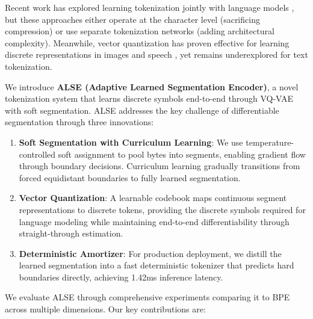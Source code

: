 \documentclass{article}
\begin{document}
Recent work has explored learning tokenization jointly with language models \cite{chung2021byt5, xue2022byt5}, but these approaches either operate at the character level (sacrificing compression) or use separate tokenization networks (adding architectural complexity). Meanwhile, vector quantization has proven effective for learning discrete representations in images \cite{van2017vqvae} and speech \cite{baevski2020wav2vec}, yet remains underexplored for text tokenization.

We introduce \textbf{ALSE (Adaptive Learned Segmentation Encoder)}, a novel tokenization system that learns discrete symbols end-to-end through VQ-VAE with soft segmentation. ALSE addresses the key challenge of differentiable segmentation through three innovations:

\begin{enumerate}
    \item \textbf{Soft Segmentation with Curriculum Learning}: We use temperature-controlled soft assignment to pool bytes into segments, enabling gradient flow through boundary decisions. Curriculum learning gradually transitions from forced equidistant boundaries to fully learned segmentation.

    \item \textbf{Vector Quantization}: A learnable codebook maps continuous segment representations to discrete tokens, providing the discrete symbols required for language modeling while maintaining end-to-end differentiability through straight-through estimation.

    \item \textbf{Deterministic Amortizer}: For production deployment, we distill the learned segmentation into a fast deterministic tokenizer that predicts hard boundaries directly, achieving 1.42ms inference latency.
\end{enumerate}

We evaluate ALSE through comprehensive experiments comparing it to BPE across multiple dimensions. Our key contributions are:
\end{document}
